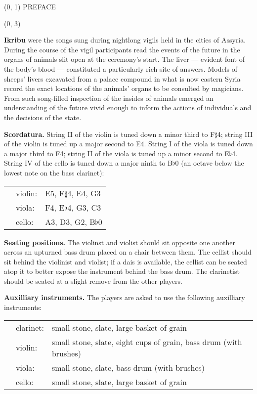 \documentclass[10pt]{article}
\begin{document}
\begin{textblock}{23}(0, 1)
\center \huge PREFACE
\end{textblock}

\begin{textblock}{23}(0, 3)

\textbf{Ikribu} were the songs sung during nightlong vigils held in the cities
of Assyria. During the course of the vigil participants read the events of the
future in the organs of animals slit open at the ceremony's start. The liver
--- evident font of the body's blood --- constituted a particularly rich site
of answers. Models of sheeps' livers excavated from a palace compound in what
is now eastern Syria record the exact locations of the animals' organs to be
consulted by magicians. From such song-filled inspection of the insides of
animals emerged an understanding of the future vivid enough to inform the
actions of individuals and the decisions of the state.

\textbf{Scordatura.} String II of the violin is tuned down a minor third to
F$\sharp$4; string III of the violin is tuned up a major second to E4. String I
of the viola is tuned down a major third to F4; string II of the viola is tuned
up a minor second to E$\flat$4. String IV of the cello is tuned down a major
ninth to B$\flat$0 (an octave below the lowest note on the bass clarinet):

\begin{tabu}{l l l}
\phantom{M} & violin: & E5, F$\sharp$4, E4, G3 \\
            & viola: & F4, E$\flat$4, G3, C3 \\
            & cello: & A3, D3, G2, B$\flat$0 \\
\end{tabu}

\textbf{Seating positions.} The violinst and violist should sit opposite one
another across an upturned bass drum placed on a chair between them. The
cellist should sit behind the violinist and violist; if a dais is available,
the cellist can be seated atop it to better expose the instrument behind the
bass drum. The clarinetist should be seated at a slight remove from the other
players.

\textbf{Auxilliary instruments.} The players are asked to use the following
auxilliary instruments:

\begin{tabu}{l l l}
\phantom{M} & clarinet: & small stone, slate, large basket of grain \\
            & violin: & small stone, slate, eight cups of grain, bass drum (with brushes) \\
            & viola: & small stone, slate, bass drum (with brushes) \\
            & cello: & small stone, slate, large basket of grain \\
\end{tabu}


\end{textblock}
\end{document}
